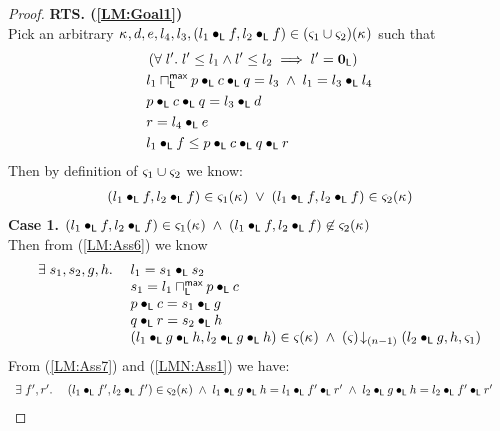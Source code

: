 \begin{lemma}[]
\begin{proof}
\noindent\textbf{RTS. (\ref{LM:Goal1})}\\
Pick an arbitrary $\kappa_{}, d, e, l_4, l_3, (l_1 \bullet_{\textsf{L}} f, l_2 \bullet_{\textsf{L}} f) \in (\varsigma_{1} \cup \varsigma_{2})(\kappa_{})$ such that
\begin{align}
	& \left(\forall\; l'.\; l' \leq l_1 \land l' \leq l_2 \implies l' = \mathbf{0}_{\textsf{L}}\right)\label{LM:Ass47}\\
	& l_1 \sqcap_{\textsf{L}}^{\textsf{max}}  p \bullet_{\textsf{L}} c \bullet_{\textsf{L}} q = l_3 \;\land\; l_1 = l_3 \bullet_{\textsf{L}} l_4 \label{LM:Ass48}\\
	& p \bullet_{\textsf{L}} c \bullet_{\textsf{L}} q = l_3 \bullet_{\textsf{L}} d \label{LM:Ass49}\\
	& r = l_4 \bullet_{\textsf{L}} e \label{LM:Ass50}\\
	& l_1 \bullet_{\textsf{L}} f \leq p \bullet_{\textsf{L}} c \bullet_{\textsf{L}} q \bullet_{\textsf{L}} r \label{LM:Ass51}
\end{align}
%
Then by definition of $\varsigma_{1} \cup \varsigma_{2}$ we know:
%
\begin{align}
	(l_1 \bullet_{\textsf{L}} f, l_2 \bullet_{\textsf{L}} f) \in \varsigma_{1}(\kappa_{}) \;\lor\; (l_1 \bullet_{\textsf{L}} f, l_2 \bullet_{\textsf{L}} f) \in \varsigma_{2}(\kappa_{}) \label{LM:Ass61}
\end{align}
%
\textbf{Case 1.} $(l_1 \bullet_{\textsf{L}} f, l_2 \bullet_{\textsf{L}} f) \in \varsigma_{1}(\kappa_{}) \;\land\; (l_1 \bullet_{\textsf{L}} f, l_2 \bullet_{\textsf{L}} f) \not\in \varsigma_{2}(\kappa_{})$\\
%
Then from (\ref{LM:Ass6}) we know
%
\begin{align}
\begin{array}{l l}
	\exists\; s_1, s_2, g, h.\; & l_1 = s_1 \bullet_{\textsf{L}} s_2\\
	& s_1 = l_1 \sqcap_{\textsf{L}}^{\textsf{max}} p \bullet_{\textsf{L}} c\\
	& p \bullet_{\textsf{L}} c = s_1 \bullet_{\textsf{L}} g\\
	& q\bullet_{\textsf{L}} r = s_2 \bullet_{\textsf{L}} h\\
	& (l_1 \bullet_{\textsf{L}} g \bullet_{\textsf{L}} h, l_2 \bullet_{\textsf{L}} g \bullet_{\textsf{L}} h) \in \varsigma_{}(\kappa_{}) \;\land\; \left(\varsigma_{}\right) \!\downarrow_{(n-1)} \left(l_2 \bullet_{\textsf{L}} g, h, \varsigma_{1}\right)
\end{array}	\label{LMN:Ass1}
\end{align}
%
From (\ref{LM:Ass7})  and (\ref{LMN:Ass1}) we have:
%
\begin{align}
	& \begin{array}{l l}
		\exists\; f', r'.\;& (l_1 \bullet_{\textsf{L}} f', l_2 \bullet_{\textsf{L}} f') \in \varsigma_{2}(\kappa_{}) \;\land\; l_1 \bullet_{\textsf{L}} g \bullet_{\textsf{L}} h = l_1 \bullet_{\textsf{L}} f' \bullet_{\textsf{L}} r' \;\land\; l_2 \bullet_{\textsf{L}} g \bullet_{\textsf{L}} h = l_2 \bullet_{\textsf{L}} f' \bullet_{\textsf{L}} r'\\

\end{array}
\end{align}
\end{proof}
\end{lemma}
